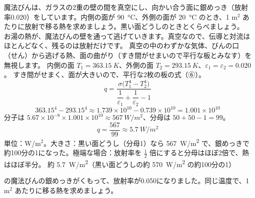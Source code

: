\begin{phreidai}[魔法びんの銀めっき]
\label{ph:熱-13:ex7}魔法びんは、ガラスの2重の壁の間を真空にし、向かい合う面に銀めっき（放射率0.020）をしています。内側の面が \qty{90}{\celsius}、外側の面が \qty{20}{\celsius} のとき、1 m$^2$ あたりに放射で移る熱を求めましょう。黒い面どうしのときとくらべましょう。
\phbamen
お湯の熱が、魔法びんの壁を通って逃げていきます。真空なので、伝導と対流はほとんどなく、残るのは放射だけです。
\phmushi
真空の中のわずかな気体、びんの口（せん）から逃げる熱、面の曲がり（すき間がせまいので平行な板とみなす）を無視します。
\phzu
内側の面 $T_1=\qty{363.15}{K}$、外側の面 $T_2=\qty{293.15}{K}$、$\varepsilon_1=\varepsilon_2=0.020$。
\phriyu
すき間がせまく、面が大きいので、平行な2枚の板の式（⑥）。
\phtateru
\[ q=\frac{\sigma\bigl(T_1^4-T_2^4\bigr)}{\dfrac{1}{\varepsilon_1}+\dfrac{1}{\varepsilon_2}-1} \]
\phtoku
\[ 363.15^4-293.15^4\approx1.739\times10^{10}-0.739\times10^{10}=1.001\times10^{10} \]
分子は $5.67\times10^{-8}\times1.001\times10^{10}\approx\qty{567}{W/m^2}$、分母は $50+50-1=99$。
\[ q=\frac{567}{99}\approx\qty{5.7}{W/m^2} \]
\phtashikame
単位：W/m$^2$。大きさ：黒い面どうし（分母1）なら \qty{567}{W/m^2} で、銀めっきで約100分の1になった。極端な場合：放射率を $\tfrac12$ 倍にすると分母はほぼ2倍で、熱はほぼ半分。
\kotae 約 \qty{5.7}{W/m^2}（黒い面どうしの約 \qty{570}{W/m^2} の約100分の1）
\end{phreidai}
\begin{jibun}
の魔法びんの銀めっきがくもって、放射率が0.050になりました。同じ温度で、1 m$^2$ あたりに移る熱を求めましょう。
\end{jibun}

